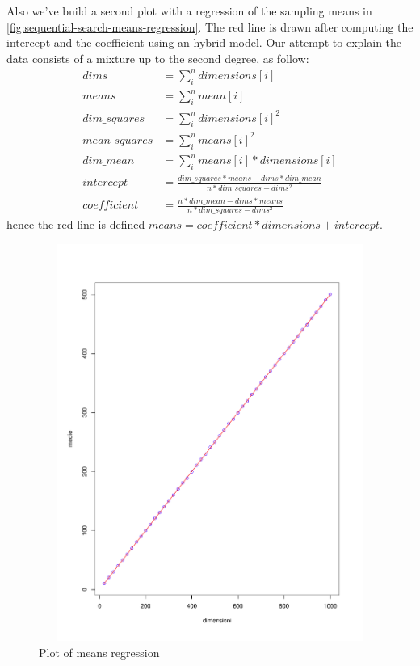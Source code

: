\documentclass[twoside,openright,titlepage,fleqn,
	headinclude,11pt,a4paper,BCOR5mm,footinclude
	]{scrbook}
\begin{document}
Also we've build a second plot with a regression of the sampling means in
\autoref{fig:sequential-search-means-regression}. The red line is
drawn after computing the intercept and the coefficient using an
hybrid model. Our attempt to explain the data consists of a mixture up
to the second degree, as follow:
\begin{displaymath}
  \begin{split}
    dims &= \sum_{i}^{n}{dimensions[i]}\\
    means &= \sum_{i}^{n}{mean[i]}\\
    dim\_squares &= \sum_{i}^{n}{dimensions[i]^2}\\
    mean\_squares &= \sum_{i}^{n}{means[i]^2}\\
    dim\_mean &= \sum_{i}^{n}{means[i] * dimensions[i]}\\
    intercept &= \frac{dim\_squares * means - dims *
      dim\_mean}{n*dim\_squares - dims^2}\\
    coefficient &= \frac{n * dim\_mean - dims * means} {n*dim\_squares-dims^2}
  \end{split}
\end{displaymath}
hence the red line is defined $means = coefficient*dimensions + intercept$.
\begin{figure}[htb]
\centering
\includegraphics[height=13cm,width=13cm]{pictures/sequential-search-mean-regression-of-sequential-search.pdf}
\caption{Plot of means regression}
\label{fig:sequential-search-means-regression}
\end{figure}
\end{document}
